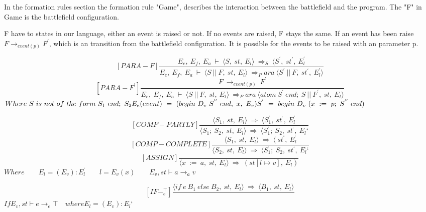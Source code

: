In the formation rules section the formation rule "Game", describes the interaction between the battlefield and the program. The "F" in Game is the battlefield configuration. 

F have to states in our language, either an event is raised or not. If no events are raised, F stays the same. If an event has been raise \begin{math} F \rightarrow_{event(p)} F^{'} \end{math}, which is an transition from the battlefield configuration. It is possible for the events to be raised with an parameter p. 

\[	
[PARA-F]	
\dfrac{E_e, \ E_f, \ E_a \ \vdash \ \langle S, \ st, \ E_l \rangle \ \Rightarrow_S \ \langle S^{'}, \ st^{'}, \ E_l^{'}}{E_e, \ E_f, \ E_a \ \vdash \ \langle S \ || \ F, \ st, \ E_l \rangle \ \Rightarrow_Para \ \langle S^{'} \ || \ F, \ st^{'}, \ E_l^{'} \rangle}	
\]\newline
\[	
[PARA-F^{'}]	
\dfrac{F \ \rightarrow_{event(p)} \ F^{'}}{E_e, \ E_f, \ E_a \ \vdash \ \langle S \ || \ F, \ st, \ E_l \rangle \ \Rightarrow_Para \ \langle atom \ S^{'} \ end; \ S \ || \ F^{'}, \ st, \ E_l \rangle}	
\]
\begin{math}		
Where \ S \ is \ not \ of \ the \ form \ S_1 \ end; \ S_2 \newline		
E_e(event) \ = \ (begin \ D_v \ S^{''} \ end, \ x, \ E_v) \newline		
S^{'} \ = \ begin \ D_v \ (x \ := \ p; \ S^{''} \ end)		
\end{math}

\[
[COMP-PARTLY]
\dfrac{\langle S_1, \ st, \ E_l \rangle \ \Rightarrow \ \langle S_1^{‘}, \ st^{‘}, \ E_l^{‘}}{\langle S_1; \ S_2, \ st, \ E_l \rangle \ \Rightarrow \ \langle S_1^{‘}; \ S_2, \ st^{‘}, \ E_l{‘}}
\]\newline
\[
[COMP-COMPLETE]
\dfrac{\langle S_1, \ st, \ E_l \rangle \ \Rightarrow \ \langle \ st^{‘}, \ E_l^{‘}}{\langle S_2, \ st, \ E_l \rangle \ \Rightarrow \ \langle S_1^{‘}; \ S_2, \ st^{‘}, \ E_l{‘}}
\]\newline
\[
[ASSIGN]
\dfrac{}{\langle x \ := \ a, \ st, \ E_l \rangle \ \Rightarrow \ (st[l \mapsto v], \ E_l)}
\]
\begin{math}
Where
\qquad E_l = (E_v) : E_l^{‘}
\qquad l = E_v(x)
\qquad E_v, st \vdash a \rightarrow_a v
\end{math}

\[
[IF-^{\top}_e]
\dfrac{\langle if \ e \ B_1 \ else \ B_2, \ st, \ E_l \rangle \ \Rightarrow \ \langle B_1, \ st, \ E_l \rangle}{}
\]
\begin{math}
If E_v, st \vdash e \rightarrow_e \top \quad where E_l = (E_v) : E_l{‘}
\end{math}

